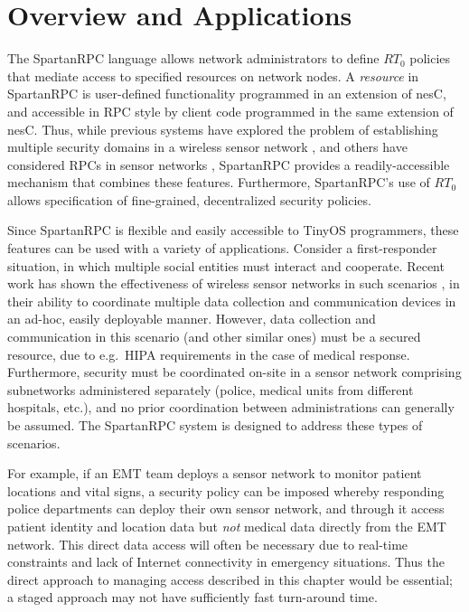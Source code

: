 \section{Overview and Applications}
\label{section-overview}

The SpartanRPC language allows network administrators to define $RT_0$ policies that mediate
access to specified resources on network nodes. A \emph{resource} in SpartanRPC is user-defined
functionality programmed in an extension of nesC, and accessible in RPC style by client code
programmed in the same extension of nesC. Thus, while previous systems have explored the problem
of establishing multiple security domains in a wireless sensor network
\cite{Claycomb:2011:NNL:1889383.1889450}, and others have considered RPCs in sensor networks
\cite{may-tinyrpc-2007,bergstrom-anycastrpc-2007,5766863}, SpartanRPC provides a
readily-accessible mechanism that combines these features. Furthermore, SpartanRPC's use of
$RT_0$ allows specification of fine-grained, decentralized security policies.

Since SpartanRPC is flexible and easily accessible to TinyOS programmers, these features can be
used with a variety of applications. Consider a first-responder situation, in which multiple
social entities must interact and cooperate. Recent work has shown the effectiveness of wireless
sensor networks in such scenarios \cite{citeulike:4460555,1038146}, in their ability to
coordinate multiple data collection and communication devices in an ad-hoc, easily deployable
manner. However, data collection and communication in this scenario (and other similar ones)
must be a secured resource, due to e.g.~HIPA requirements in the case of medical response.
Furthermore, security must be coordinated on-site in a sensor network comprising subnetworks
administered separately (police, medical units from different hospitals, etc.), and no prior
coordination between administrations can generally be assumed. The SpartanRPC system is designed
to address these types of scenarios.

For example, if an EMT team deploys a sensor network to monitor patient locations and vital
signs, a security policy can be imposed whereby responding police departments can deploy their
own sensor network, and through it access patient identity and location data but \emph{not}
medical data directly from the EMT network. This direct data access will often be necessary due
to real-time constraints and lack of Internet connectivity in emergency situations. Thus the
direct approach to managing access described in this chapter would be essential; a staged
approach may not have sufficiently fast turn-around time.

